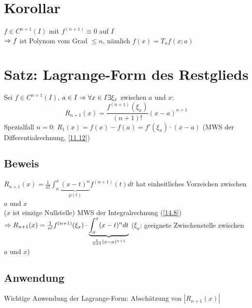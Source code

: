 \fancyhead[R]{}
\section{Korollar}\label{15.2}
$f \in C^{n+1}(I)$ mit $f^{(n+1)} \equiv 0$ auf $I$\\
$\Rightarrow f$ ist Polynom vom Grad $\le n$, nämlich $f(x)=T_n f(x; a)$

\section{Satz: Lagrange-Form des Restglieds}\label{15.3}
Sei $f \in C^{n+1}(I)$, $a \in I \Rightarrow \forall x \in I \exists \xi_x$ zwischen $a$ und $x$:
$$R_{n+1}(x) = \frac{f^{(n+1)}(\xi_x)}{(n+1)!} (x-a)^{n+1}$$
Spezialfall $n=0$: $R_1(x)=f(x)-f(a)=f'(\xi_x) \cdot (x-a)$ (MWS der Differentialrechnung, \ref{11.12})

\subsection*{Beweis}
$R_{n+1}(x) = \frac{1}{n!} \int_a^x \underbrace{(x-t)^n}_{p(t)} f^{(n+1)}(t) dt$ hat einheitliches Vorzeichen zwischen $a$ und $x$\\
($x$ ist einzige Nullstelle)\nl
MWS der Integralrechnung (\ref{14.8}) $\Rightarrow R_{n+1}(x) = \frac{1}{n!} f^{(n+1)}(\xi_x) \cdot \underbrace{\int_a^x (x-t)^n dt}_{\frac{1}{n+1}(x-a)^{n+1}}$ ($\xi_x$: geeignete Zwischenstelle zwischen $a$ und $x$)

\subsection*{Anwendung}
Wichtige Anwendung der Lagrange-Form: Abschätzung von $|R_{n+1}(x)|$

